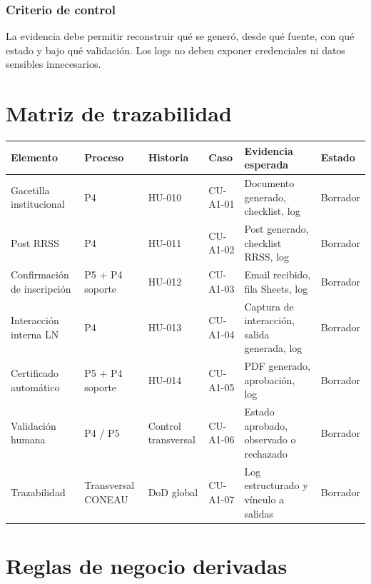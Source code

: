\documentclass[11pt,a4paper]{article}
\begin{document}
\subsubsection{Criterio de control}

La evidencia debe permitir reconstruir qué se generó, desde qué fuente, con qué estado y bajo qué validación. Los logs no deben exponer credenciales ni datos sensibles innecesarios.

\section{Matriz de trazabilidad}

\begingroup
\small
\setlength{\tabcolsep}{2pt}
\begin{longtable}{@{}p{}p{}p{}p{}p{}p{}@{}}
\toprule
\textbf{Elemento} & \textbf{Proceso} & \textbf{Historia} & \textbf{Caso} & \textbf{Evidencia esperada} & \textbf{Estado} \\
\midrule
\endhead
Gacetilla institucional & P4 & HU-010 & CU-A1-01 & Documento generado, checklist, log & Borrador \\
Post RRSS & P4 & HU-011 & CU-A1-02 & Post generado, checklist RRSS, log & Borrador \\
Confirmación de inscripción & P5 + P4 soporte & HU-012 & CU-A1-03 & Email recibido, fila Sheets, log & Borrador \\
Interacción interna LN & P4 & HU-013 & CU-A1-04 & Captura de interacción, salida generada, log & Borrador \\
Certificado automático & P5 + P4 soporte & HU-014 & CU-A1-05 & PDF generado, aprobación, log & Borrador \\
Validación humana & P4 / P5 & Control transversal & CU-A1-06 & Estado aprobado, observado o rechazado & Borrador \\
Trazabilidad & Transversal CONEAU & DoD global & CU-A1-07 & Log estructurado y vínculo a salidas & Borrador \\
\bottomrule
\end{longtable}
\endgroup

\section{Reglas de negocio derivadas}
\end{document}
